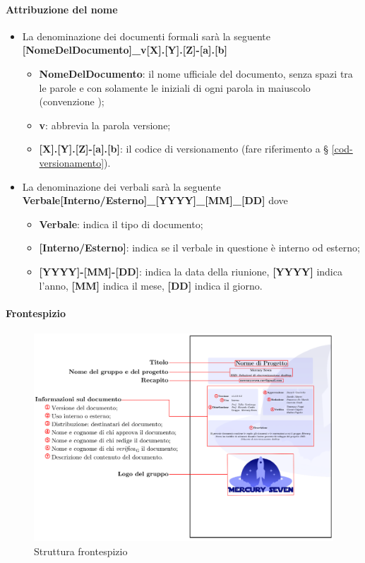 {\paragraph*{Attribuzione del nome}
\begin{itemize}
	\item La denominazione dei documenti formali sarà la seguente \newline
	\textbf{[NomeDelDocumento]\_v[X].[Y].[Z]-[a].[b]}
	\begin{itemize}
		\item \textbf{NomeDelDocumento}: il nome ufficiale del documento, senza spazi tra le parole e con solamente le iniziali di ogni parola in maiuscolo (convenzione );
		\item \textbf{v}: abbrevia la parola versione;
		\item \textbf{[X].[Y].[Z]-[a].[b]}: il codice di versionamento (fare riferimento a \S{} \ref{cod-versionamento}).
	\end{itemize}
	\item La denominazione dei verbali sarà la seguente\newline
	\textbf{Verbale[Interno/Esterno]\_[YYYY]\_[MM]\_[DD]}\newline
	dove
	\begin{itemize}
		\item \textbf{Verbale}: indica il tipo di documento;
		\item \textbf{[Interno/Esterno]}: indica se il verbale in questione è interno od esterno;
		\item \textbf{[YYYY]-[MM]-[DD]}: indica la data della riunione, \textbf{[YYYY]} indica l'anno, \textbf{[MM]} indica il mese, \textbf{[DD]} indica il giorno.
	\end{itemize}
\end{itemize}
\paragraph*{Frontespizio}    

\begin{figure}[H]
    \centering
    \includegraphics[scale = 0.6]{components/immagini/frontespizio.png}
    \caption{Struttura frontespizio}
\end{figure}


}
